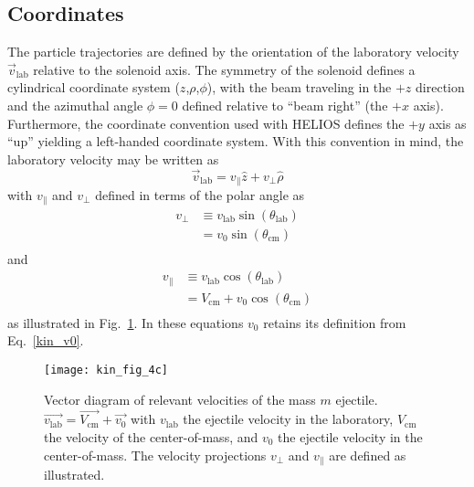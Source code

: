 \subsection{Coordinates}
\label{coord}
The particle trajectories are defined by the orientation of the laboratory velocity $\vec{v}_\mathrm{lab}$ relative to the solenoid axis.  The symmetry of the solenoid defines a cylindrical coordinate system ($z$,$\rho$,$\phi$), with the beam traveling in the $+z$ direction and the azimuthal angle $\phi=0$ defined relative to ``beam right'' (the $+x$ axis).  Furthermore, the coordinate convention used with HELIOS defines the $+y$ axis as ``up'' yielding a left-handed coordinate system.  With this convention in mind, the laboratory velocity may be written as 
\begin{equation}
\vec{v}_\mathrm{lab}=v_\parallel \hat{z}+v_\perp \hat{\rho}
\label{lab_vel}
\end{equation}
with $v_\parallel$ and $v_\perp$ defined in terms of the polar angle as
\begin{equation}
\begin{split}
v_\perp&\equiv v_\mathrm{lab}\sin(\theta_\mathrm{lab})\\
&=v_0\sin(\theta_\mathrm{cm})\\
\end{split}
\end{equation}
and
\begin{equation}
\begin{split}
v_\parallel &\equiv v_\mathrm{lab}\cos(\theta_\mathrm{lab})\\
&=V_\mathrm{cm}+v_0\cos(\theta_\mathrm{cm})\\
\end{split}
\label{eq:vpara}
\end{equation}
 as illustrated in Fig.~\ref{vector}.  In these equations $v_0$ retains its definition from Eq.~\ref{kin_v0}.
\begin{figure}
\begin{center}
\texttt{[image: kin\_fig\_4c]}
\setlength{\unitlength}{0.125\columnwidth}

\end{center}
\caption[Vector diagram of relevant velocities of the mass $m$ ejectile]{Vector diagram of relevant velocities of the mass $m$ ejectile. $\vec{v_\mathrm{lab}}=\vec{V_\mathrm{cm}}+\vec{v_0}$ with $v_\mathrm{lab}$ the ejectile velocity in the laboratory, $V_\mathrm{cm}$ the velocity of the center-of-mass, and $v_0$ the ejectile velocity in the center-of-mass.  The velocity projections $v_\perp$ and $v_\parallel$ are defined as illustrated.}%
\label{vector}%
\end{figure}
